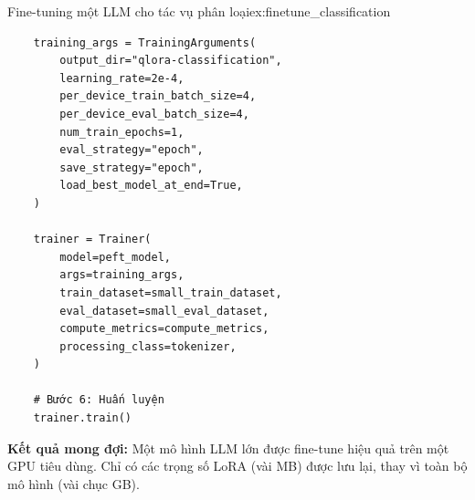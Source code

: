 \begin{example}{Fine-tuning một LLM cho tác vụ phân loại}{ex:finetune_classification}
\begin{verbatim}
    training_args = TrainingArguments(
        output_dir="qlora-classification",
        learning_rate=2e-4,
        per_device_train_batch_size=4,
        per_device_eval_batch_size=4,
        num_train_epochs=1,
        eval_strategy="epoch",
        save_strategy="epoch",
        load_best_model_at_end=True,
    )
    
    trainer = Trainer(
        model=peft_model,
        args=training_args,
        train_dataset=small_train_dataset,
        eval_dataset=small_eval_dataset,
        compute_metrics=compute_metrics,
        processing_class=tokenizer,
    )
    
    # Bước 6: Huấn luyện
    trainer.train()
    \end{verbatim}
\end{example}
\textbf{Kết quả mong đợi:} Một mô hình LLM lớn được fine-tune hiệu quả trên một GPU tiêu dùng. Chỉ có các trọng số LoRA (vài MB) được lưu lại, thay vì toàn bộ mô hình (vài chục GB).
